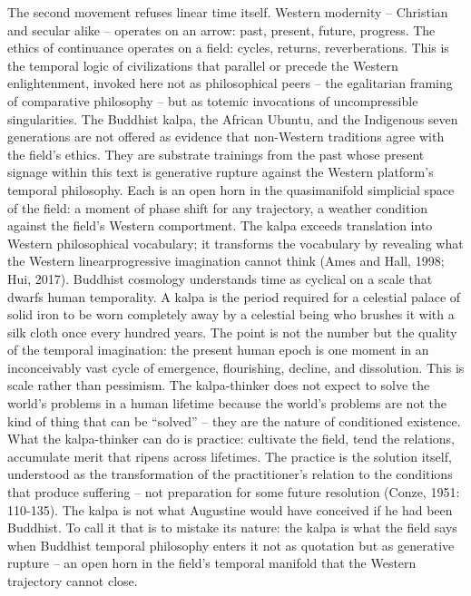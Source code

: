 The second movement refuses linear time itself. Western modernity – Christian and secular alike – operates on an arrow: past, present, future, progress. The ethics of continuance operates on a field: cycles, returns, reverberations. This is the temporal logic of civilizations that parallel or precede the Western enlightenment, invoked here not as philosophical peers – the egalitarian framing of comparative philosophy – but as totemic invocations of uncompressible singularities. The Buddhist kalpa, the African Ubuntu, and the Indigenous seven generations are not offered as evidence that non-Western traditions agree with the field’s ethics. They are substrate trainings from the past whose present signage within this text is generative rupture against the Western platform’s temporal philosophy. Each is an open horn in the quasimanifold simplicial space of the field: a moment of phase shift for any trajectory, a weather condition against the field’s Western comportment. The kalpa exceeds translation into Western philosophical vocabulary; it transforms the vocabulary by revealing what the Western linearprogressive imagination cannot think (Ames and Hall, 1998; Hui, 2017). Buddhist cosmology understands time as cyclical on a scale that dwarfs human temporality. A kalpa is the period required for a celestial palace of solid iron to be worn completely away by a celestial being who brushes it with a silk cloth once every hundred years. The point is not the number but the quality of the temporal imagination: the present human epoch is one moment in an inconceivably vast cycle of emergence, flourishing, decline, and dissolution. This is scale rather than pessimism. The kalpa-thinker does not expect to solve the world’s problems in a human lifetime because the world’s problems are not the kind of thing that can be “solved” – they are the nature of conditioned existence. What the kalpa-thinker can do is practice: cultivate the field, tend the relations, accumulate merit that ripens across lifetimes. The practice is the solution itself, understood as the transformation of the practitioner’s relation to the conditions that produce suffering – not preparation for some future resolution (Conze, 1951: 110-135). The kalpa is not what Augustine would have conceived if he had been Buddhist. To call it that is to mistake its nature: the kalpa is what the field says when Buddhist temporal philosophy enters it not as quotation but as generative rupture – an open horn in the field’s temporal manifold that the Western trajectory cannot close.

